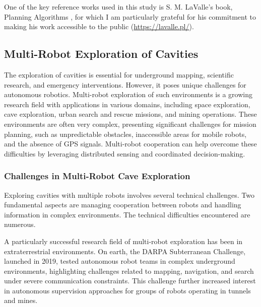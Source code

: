 \documentclass[../main.tex]{subfiles}
\begin{document}
One of the key reference works used in this study is S. M. LaValle's book, Planning Algorithms \cite{Lavalle_2006}, for which I am particularly grateful for his commitment to making his work accessible to the public ({\scriptsize \url{https://lavalle.pl/}}).

\subsection{Multi-Robot Exploration of Cavities}

The exploration of cavities is essential for underground mapping, scientific research, and emergency interventions. However, it poses unique challenges for autonomous robotics.\cite{nationalgeographic_greenland_caves_2025, scalea_2019} Multi-robot exploration of such environments is a growing research field with applications in various domains, including space exploration, cave exploration, urban search and rescue missions, and mining operations.\cite{dang_2021,kambesis_2007} These environments are often very complex, presenting significant challenges for mission planning, such as unpredictable obstacles, inaccessible areas for mobile robots, and the absence of GPS signals. Multi-robot cooperation can help overcome these difficulties by leveraging distributed sensing and coordinated decision-making.

\subsubsection{Challenges in Multi-Robot Cave Exploration}

Exploring cavities with multiple robots involves several technical challenges. Two fundamental aspects are managing cooperation between robots and handling information in complex environments. The technical difficulties encountered are numerous.\cite{scalea_2019}

\vspace{1em}

A particularly successful research field of multi-robot exploration has been in extraterrestrial environments. On earth, the DARPA Subterranean Challenge, launched in 2019, tested autonomous robot teams in complex underground environments, highlighting challenges related to mapping, navigation, and search under severe communication constraints. This challenge further increased interest in autonomous supervision approaches for groups of robots operating in tunnels and mines.\cite{otsu_2020} 

\vspace{1em}
\end{document}
